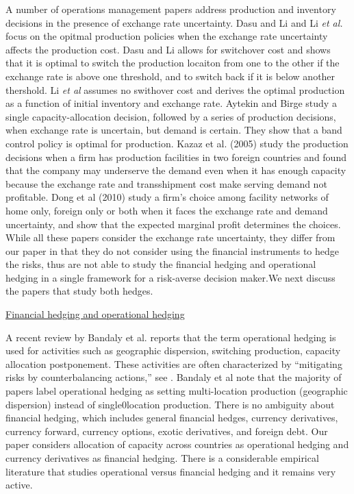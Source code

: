 \documentclass[mnsc,nonblindrev,copyedit]{informs2_wz} %
\begin{document}
A number of operations management papers address production and inventory decisions in the presence of exchange rate uncertainty.  Dasu and Li \cite{Dasu} and Li {\it et al.} \cite{Li2001} focus on the opitmal production policies when the exchange rate uncertainty affects the production cost.  Dasu and Li allows for switchover cost and shows that it is optimal to switch the production locaiton from one to the other if the exchange rate is above one threshold, and to switch back if it is below another thershold. Li {\it et al} assumes no swithover cost and derives the optimal production as a function of initial inventory and exchange rate. Aytekin and Birge \cite{Aytekin2004} study a single capacity-allocation decision, followed by a series of production decisions, when exchange rate is uncertain, but demand is certain.  They show that a band control policy is optimal for production. Kazaz et al. (2005) study the production decisions when a firm has production facilities in two foreign countries and found that the company may underserve the demand even when it has enough capacity because the exchange rate and transshipment cost make serving demand not profitable. Dong et al (2010) study a firm's choice among facility networks of home only, foreign only or both when it faces the exchange rate and demand uncertainty, and show that the expected marginal profit determines the choices.  While all these papers consider the exchange rate uncertainty, they differ from our paper in that they do not consider using the financial instruments to hedge the risks, thus are not able to study the financial hedging and operational hedging in a single framework for a risk-averse decision maker.We next discuss the papers that study both hedges. 





\noindent \underline{Financial hedging and operational hedging}

A recent review by Bandaly et al. \cite{Bandaly_supply_2010} reports that the term operational hedging is used for activities such as geographic dispersion, switching production, capacity allocation postponement. These activities are often characterized by ``mitigating risks by counterbalancing actions,'' see \cite{vanmieghem2003}.  Bandaly et al note that the majority of papers label operational hedging as setting multi-location production (geographic dispersion) instead of single0location production.  %
There is no ambiguity about financial hedging, which includes general financial hedges, currency derivatives, currency forward, currency options, exotic derivatives, and foreign debt.  Our paper considers allocation of capacity across countries as operational hedging and currency derivatives as financial hedging. There is a considerable empirical literature that studies operational versus financial hedging and it remains very active.
\end{document}

